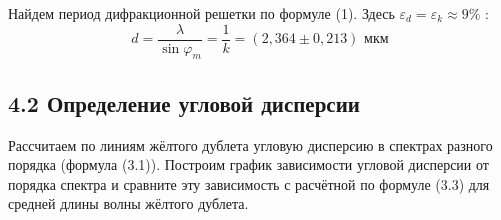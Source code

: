\documentclass[a4paper,12pt]{report}
\begin{document}
Найдем период дифракционной решетки по формуле (1). Здесь $\varepsilon_{d} = \varepsilon_{k} \approx 9\%$ : 
\begin{equation*}
    d = \frac{\lambda}{\sin{\varphi_{m}}} = \frac{1}{k} = (2,364 \pm 0,213) \text{ мкм}
\end{equation*}

\subsection*{4.2 Определение угловой дисперсии}

Рассчитаем по линиям жёлтого дублета угловую дисперсию в спектрах
разного порядка (формула (3.1)). Построим график зависимости угловой дисперсии от порядка спектра и сравните эту зависимость с расчётной по формуле (3.3) для средней длины волны жёлтого дублета.
\end{document}

